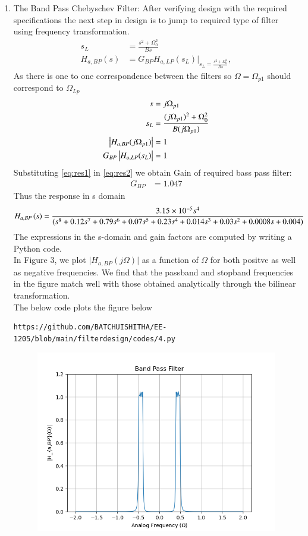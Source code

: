\documentclass{article}
\begin{document}
\begin{enumerate}
\item {The Band Pass Chebyschev Filter:} 
After verifying design with the required specifications the next step in design is to jump to required type of filter using frequency transformation. 
\begin{align}
    s_L &= \frac{s^2 + \Omega_0^2}{Bs} \\
    H_{a,BP}(s) &= G_{BP}H_{a,LP}(s_L)\vert_{s_L = \frac{s^2 + \Omega_0^2}{Bs}},
\end{align}
As there is one to one correspondence between the filters so $\Omega=\Omega_{p1}$ should correspond to $\Omega_{Lp}$
\begin{align}
    s &= j\Omega_{p1}\\
    s_{L} &= \frac{(j\Omega_{p1})^2 + \Omega_0^2}{B(j\Omega_{p1})} \label{eq:res1} \\ 
    \left\vert H_{a,BP}(j\Omega_{p1})\right\vert &= 1 \\
    G_{BP}\left\vert H_{a,LP}(s_L)\right\vert &= 1 \label{eq:res2}
\end{align}
Substituting \eqref{eq:res1} in \eqref{eq:res2} we obtain Gain of required bass pass filter:
\begin{align}
    G_{BP} &= 1.047 
\end{align}
Thus the response in s domain 
\begin{align}
    H_{a,BP}\left(s\right) &= \frac{3.15\times 10^{-5}s^4}{(s^8 + 0.12s^7 + 0.79s^6 + 0.07s^5 + 0.23s^4 + 0.014s^3 + 0.03s^2 + 0.0008s + 0.004)}
 \label{eq:magnitude_bandpass_sdom}
\end{align}
The expressions in the s-domain and gain factors are computed by writing a Python code. \\
In Figure 3, we plot $\vert H_{a,BP}(j\Omega)\vert$ as a function of $\Omega$ for both positve as
well as negative frequencies.  We find that the passband and stopband frequencies in the figure
match well with those obtained analytically through the bilinear transformation.\\
The below code plots the figure below
\begin{lstlisting}
https://github.com/BATCHUISHITHA/EE-1205/blob/main/filterdesign/codes/4.py
\end{lstlisting}
\begin{figure}[H]
\centering
\includegraphics[width=1\columnwidth]{figs/4.png}

\end{figure}
\end{enumerate}
\end{document}
